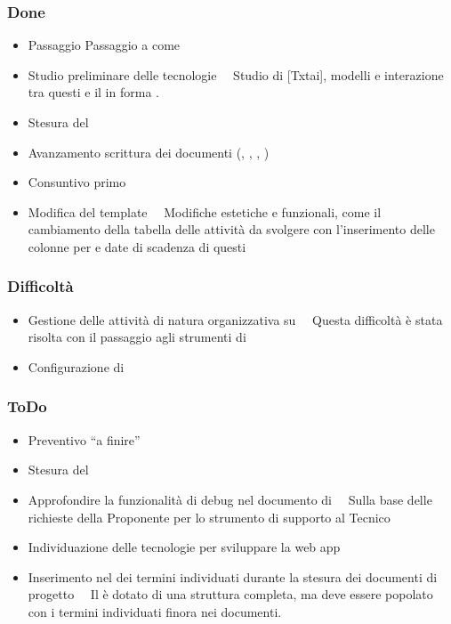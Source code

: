 \subsubsection{Done}
\begin{itemize}
	\item Passaggio Passaggio a  come 
	\item Studio preliminare delle tecnologie \ \rightarrow\ Studio di [Txtai], modelli e interazione tra questi e il  in forma .
	\item Stesura del 
	\item Avanzamento scrittura dei documenti (\PianoDiProgetto, \NormeDiProgetto, \AnalisiDeiRequisiti, \Glossario)
	\item Consuntivo primo 
	\item Modifica del template  \ \rightarrow\ Modifiche estetiche e funzionali, come il cambiamento della tabella delle attività da svolgere con l'inserimento delle colonne per  e date di scadenza di questi
\end{itemize}
\subsubsection{Difficoltà}
\begin{itemize}
	\item Gestione delle attività di natura organizzativa su  \ \rightarrow\ Questa difficoltà è stata risolta con il passaggio agli strumenti di 
	\item Configurazione di 
\end{itemize}	
\subsubsection{ToDo}
\begin{itemize}
	\item Preventivo “a finire”
	\item Stesura del \PianoDiQualifica
	\item Approfondire la funzionalità di debug nel documento di \AnalisiDeiRequisiti \ \rightarrow\ Sulla base delle richieste della Proponente per lo strumento di supporto al Tecnico
	\item Individuazione delle tecnologie per sviluppare la web app
	\item Inserimento nel \Glossario dei termini individuati durante la stesura dei documenti di progetto \ \rightarrow\ Il \Glossario è dotato di una struttura completa, ma deve essere popolato con i termini individuati finora nei documenti.	
\end{itemize}
